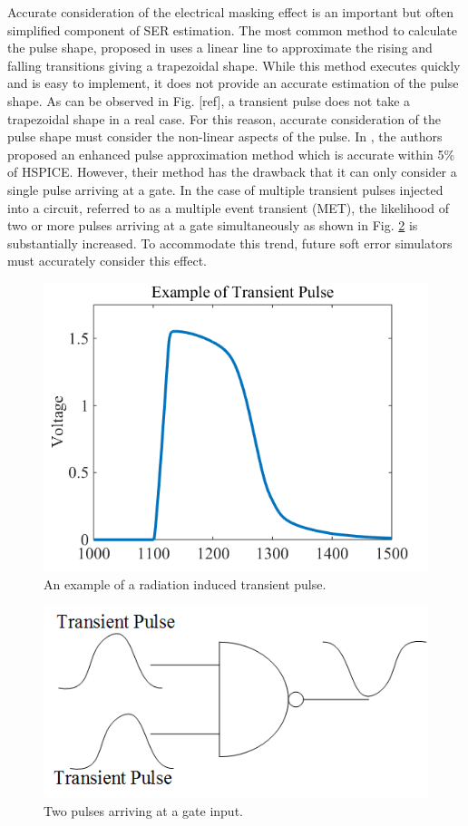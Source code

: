 Accurate consideration of the electrical masking effect is an important but often simplified component of SER estimation. The most common method to calculate the pulse shape, proposed in \cite{Omana_Trap} uses a linear line to approximate the rising and falling transitions giving a trapezoidal shape. While this method executes quickly and is easy to implement, it does not provide an accurate estimation of the pulse shape. As can be observed in Fig. [ref], a transient pulse does not take a trapezoidal shape in a real case. For this reason, accurate consideration of the pulse shape must consider the non-linear aspects of the pulse. In \cite{Accurate_Masking}, the authors proposed an enhanced pulse approximation method which is accurate within 5\% of HSPICE. However, their method has the drawback that it can only consider a single pulse arriving at a gate. In the case of multiple transient pulses injected into a circuit, referred to as a multiple event transient (MET), the likelihood of two or more pulses arriving at a gate simultaneously as shown in Fig. \ref{G_pulse} is substantially increased. To accommodate this trend, future soft error simulators must accurately consider this effect.

\begin{figure}[!htbp]
	\centering
	\includegraphics[width=0.45\linewidth]{Figures/Pulse_Shape}
	\caption{An example of a radiation induced transient pulse.}
	\label{T_pulse}
\end{figure} 

\begin{figure}[!htbp]
	\centering
	\includegraphics[width=0.45\linewidth]{Figures/gatepulse}
	\caption{Two pulses arriving at a gate input.}
	\label{G_pulse}
\end{figure} 

